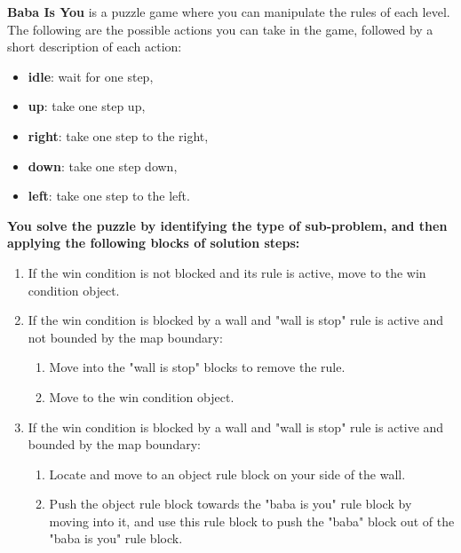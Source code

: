 \begin{GreenBox}
	[frametitle={\textbf{Iteration 3 Baba-is-ai Prompt}}]

	\textbf{Baba Is You} is a puzzle game where you can manipulate the rules of each
	level. The following are the possible actions you can take in the game, followed
	by a short description of each action:

	\begin{itemize}
		\item \textbf{idle}: wait for one step,

		\item \textbf{up}: take one step up,

		\item \textbf{right}: take one step to the right,

		\item \textbf{down}: take one step down,

		\item \textbf{left}: take one step to the left.
	\end{itemize}

	\textbf{You solve the puzzle by identifying the type of sub-problem, and then applying
	the following blocks of solution steps:}
	\begin{enumerate}
		\item If the win condition is not blocked and its rule is active, move to
			the win condition object.

		\item If the win condition is blocked by a wall and "wall is stop" rule is active
			and not bounded by the map boundary:
			\begin{enumerate}
				\item Move into the "wall is stop" blocks to remove the rule.

				\item Move to the win condition object.
			\end{enumerate}

		\item If the win condition is blocked by a wall and "wall is stop" rule is active
			and bounded by the map boundary:
			\begin{enumerate}
				\item Locate and move to an object rule block on your side of the wall.

				\item Push the object rule block towards the "baba is you" rule block by
					moving into it, and use this rule block to push the "baba" block out
					of the "baba is you" rule block.
			\end{enumerate}


\end{enumerate}
\end{GreenBox}
